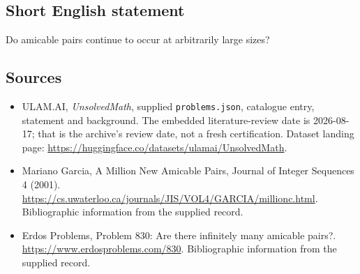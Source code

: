 \documentclass[11pt,a4paper]{article}
\begin{document}
\subsection{Short English statement}

Do amicable pairs continue to occur at arbitrarily large sizes?

\subsection{Sources}

{\small

\begin{itemize}

\item[\hypertarget{source:statement:1}{S1}] ULAM.AI, \emph{UnsolvedMath}, supplied \texttt{problems.json}, catalogue entry, statement and background. The embedded literature-review date is 2026-08-17; that is the archive’s review date, not a fresh certification. Dataset landing page: \url{https://huggingface.co/datasets/ulamai/UnsolvedMath}.

\item[\hypertarget{source:statement:2}{S2}] Mariano Garcia, A Million New Amicable Pairs, Journal of Integer Sequences 4 (2001). \url{https://cs.uwaterloo.ca/journals/JIS/VOL4/GARCIA/millionc.html}. Bibliographic information from the supplied record.

\item[\hypertarget{source:statement:3}{S3}] Erdos Problems, Problem 830: Are there infinitely many amicable pairs?. \url{https://www.erdosproblems.com/830}. Bibliographic information from the supplied record.

\end{itemize}

}

\label{end:statement}
\end{document}
